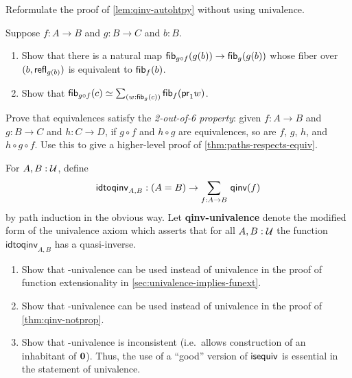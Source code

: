 \begin{ex} \label{ex:qinv-autohtpy-no-univalence}
  Reformulate the proof of \cref{lem:qinv-autohtpy} without using univalence.
\end{ex}

\begin{ex}\label{ex:unstable-octahedron}
  Suppose $f:A\to B$ and $g:B\to C$ and $b:B$.
  \begin{enumerate}
  \item Show that there is a natural map ${\mathsf{fib}}_{g\circ f}(g(b)) \to {\mathsf{fib}}_{g}(g(b))$ whose fiber over $(b,\mathsf{refl}_{g(b)})$ is equivalent to ${\mathsf{fib}}_{f}(b)$.
  \item Show that $\eqv{\hfib{g\circ f}{c}}{\sm{w:\hfib{g}{c}} \hfib f {\proj1 w}}$.
  \end{enumerate}
\end{ex}

\begin{ex}\label{ex:2-out-of-6}
  Prove that equivalences satisfy the \emph{2-out-of-6 property}: given $f:A\to B$ and $g:B\to C$ and $h:C\to D$, if $g\circ f$ and $h\circ g$ are equivalences, so are $f$, $g$, $h$, and $h\circ g\circ f$.
  Use this to give a higher-level proof of \cref{thm:paths-respects-equiv}.
\end{ex}

\begin{ex}\label{ex:qinv-univalence}
  For $A,B:\mathcal{U}$, define
  \[ \mathsf{idtoqinv}_{A,B} :(A=B) \to \sm{f:A\to B}\qinv(f) \]
  by path induction in the obvious way.
  Let \textbf{\textsf{qinv}-univalence} denote the modified form of the univalence axiom which asserts that for all $A,B:\mathcal{U}$ the function $\mathsf{idtoqinv}_{A,B}$ has a quasi-inverse.
  \begin{enumerate}
  \item Show that \qinv-univalence can be used instead of univalence in the proof of function extensionality in \cref{sec:univalence-implies-funext}.
  \item Show that \qinv-univalence can be used instead of univalence in the proof of \cref{thm:qinv-notprop}.
  \item Show that \qinv-univalence is inconsistent (i.e.\ allows construction of an inhabitant of $\mathbf{0}$).
    Thus, the use of a ``good'' version of $\mathsf{isequiv}$ is essential in the statement of univalence.
  \end{enumerate}
\end{ex}

